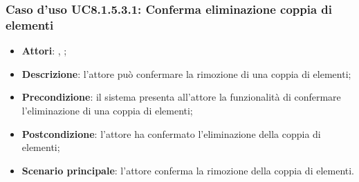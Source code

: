 		\subsubsection{Caso d'uso UC8.1.5.3.1: Conferma eliminazione coppia di elementi}
		\begin{itemize}
			\item \textbf{Attori}: \uau, \uaupro;
			\item \textbf{Descrizione}: l'attore può confermare la rimozione di una coppia di elementi;
			\item \textbf{Precondizione}: il sistema presenta all'attore la funzionalità di confermare l'eliminazione di una coppia di elementi;
			\item \textbf{Postcondizione}: l'attore ha confermato l'eliminazione della coppia di elementi;
			\item \textbf{Scenario principale}: l'attore conferma la rimozione della coppia di elementi.
		\end{itemize}

